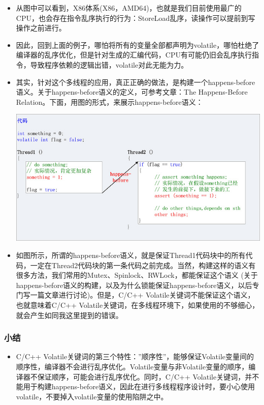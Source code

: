 \documentclass[9pt,b5paper]{article}
\begin{document}
\begin{itemize}
\item 从图中可以看到，X86体系(X86，AMD64)，也就是我们目前使用最广的CPU，也会存在指令乱序执行的行为：StoreLoad乱序，读操作可以提前到写操作之前进行。
\item 因此，回到上面的例子，哪怕将所有的变量全部都声明为volatile，哪怕杜绝了编译器的乱序优化，但是针对生成的汇编代码，CPU有可能仍旧会乱序执行指令，导致程序依赖的逻辑出错，volatile对此无能为力。
\item 其实，针对这个多线程的应用，真正正确的做法，是构建一个happens-before语义。关于happens-before语义的定义，可参考文章：The Happens-Before Relation。下面，用图的形式，来展示happens-before语义：

\includegraphics[width=.9\linewidth]{../pic/v11.jpg}

\item 如图所示，所谓的happens-before语义，就是保证Thread1代码块中的所有代码，一定在Thread2代码块的第一条代码之前完成。当然，构建这样的语义有很多方法，我们常用的Mutex、Spinlock、RWLock，都能保证这个语义 (关于happens-before语义的构建，以及为什么锁能保证happens-before语义，以后专门写一篇文章进行讨论)。但是，C/C++ Volatile关键词不能保证这个语义，也就意味着C/C++ Volatile关键词，在多线程环境下，如果使用的不够细心，就会产生如同我这里提到的错误。
\end{itemize}
\subsubsection{小结}
\label{sec-9-3-5}
\begin{itemize}
\item C/C++ Volatile关键词的第三个特性：”顺序性”，能够保证Volatile变量间的顺序性，编译器不会进行乱序优化。Volatile变量与非Volatile变量的顺序，编译器不保证顺序，可能会进行乱序优化。同时，C/C++ Volatile关键词，并不能用于构建happens-before语义，因此在进行多线程程序设计时，要小心使用volatile，不要掉入volatile变量的使用陷阱之中。
\end{itemize}
\end{document}
